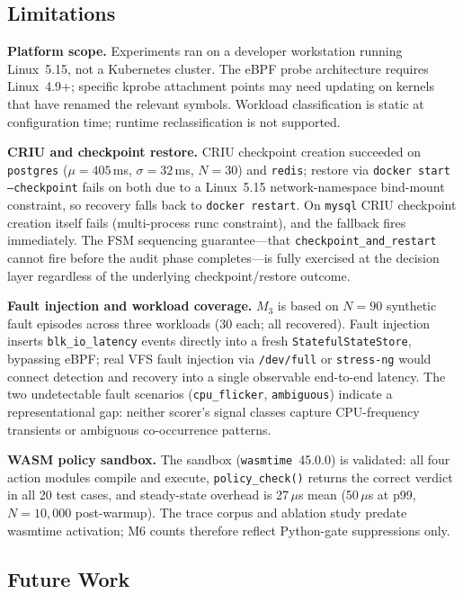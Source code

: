 \documentclass[conference]{IEEEtran}
\begin{document}
\subsection{Limitations}
\label{sec:limitations}

\textbf{Platform scope.} Experiments ran on a developer workstation running Linux~5.15, not a Kubernetes cluster. The eBPF probe architecture requires Linux~4.9+; specific kprobe attachment points may need updating on kernels that have renamed the relevant symbols. Workload classification is static at configuration time; runtime reclassification is not supported.

\textbf{CRIU and checkpoint restore.} CRIU checkpoint creation succeeded on \texttt{postgres} ($\mu = 405$\,ms, $\sigma = 32$\,ms, $N=30$) and \texttt{redis}; restore via \texttt{docker start --checkpoint} fails on both due to a Linux~5.15 network-namespace bind-mount constraint, so recovery falls back to \texttt{docker restart}. On \texttt{mysql} CRIU checkpoint creation itself fails (multi-process runc constraint), and the fallback fires immediately. The FSM sequencing guarantee---that \texttt{checkpoint\_and\_restart} cannot fire before the audit phase completes---is fully exercised at the decision layer regardless of the underlying checkpoint/restore outcome.

\textbf{Fault injection and workload coverage.} $M_3$ is based on $N = 90$ synthetic fault episodes across three workloads (30 each; all recovered). Fault injection inserts \texttt{blk\_io\_latency} events directly into a fresh \texttt{StatefulStateStore}, bypassing eBPF; real VFS fault injection via \texttt{/dev/full} or \texttt{stress-ng} would connect detection and recovery into a single observable end-to-end latency. The two undetectable fault scenarios (\texttt{cpu\_flicker}, \texttt{ambiguous}) indicate a representational gap: neither scorer's signal classes capture CPU-frequency transients or ambiguous co-occurrence patterns.

\textbf{WASM policy sandbox.} The sandbox (\texttt{wasmtime}~45.0.0) is validated: all four action modules compile and execute, \texttt{policy\_check()} returns the correct verdict in all 20 test cases, and steady-state overhead is 27\,$\mu$s mean (50\,$\mu$s at p99, $N = 10{,}000$ post-warmup). The trace corpus and ablation study predate wasmtime activation; M6 counts therefore reflect Python-gate suppressions only.

\subsection{Future Work}
\end{document}
